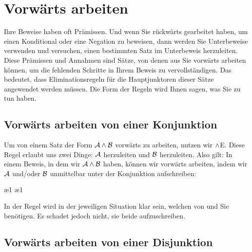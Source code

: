 \section{Vorwärts arbeiten}

Ihre Beweise haben oft Prämissen. Und wenn Sie rückwärts gearbeitet haben, um einen Konditional oder eine Negation zu beweisen, dann werden Sie Unterbeweise verwenden und versuchen, einen bestimmten Satz im Unterbeweis herzuleiten. Diese Prämissen und Annahmen sind Sätze, von denen aus Sie vorwärts arbeiten können, um die fehlenden Schritte in Ihrem Beweis zu vervollständigen. Das bedeutet, dass Eliminationsregeln für die Hauptjunktoren dieser Sätze angewendet werden müssen. Die Form der Regeln wird Ihnen sagen, was Sie zu tun haben. 

\subsection*{Vorwärts arbeiten von einer Konjunktion}

Um von einem Satz der Form $\mathcal{A} \wedge \mathcal{B}$ vorwärts zu arbeiten, nutzen wir $\wedge$E. Diese Regel erlaubt uns zwei Dinge: $\mathcal{A}$ herzuleiten und $\mathcal{B}$ herzuleiten. Also gilt: In einem Beweis, in dem wir $\mathcal{A} \wedge \mathcal{B}$ haben, können wir vorwärts arbeiten, indem wir $\mathcal{A}$ und/oder $\mathcal{B}$ unmittelbar unter der Konjunktion aufschreiben:
\begin{fitchproof}
  \ae{1}
  \ae{1}
\end{fitchproof}
In der Regel wird in der jeweiligen Situation klar sein, welchen von  und  Sie benötigen. Es schadet jedoch nicht, sie beide aufzuschreiben.

\subsection*{Vorwärts arbeiten von einer Disjunktion}

